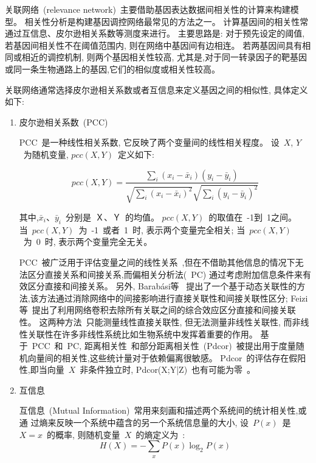 关联网络~(relevance network)~主要借助基因表达数据间相关性的计算来构建模型。
相关性分析是构建基因调控网络最常见的方法之一。
计算基因间的相关性常通过互信息、皮尔逊相关系数等测度来进行。
主要思路是: 对于预先设定的阈值, 若基因间相关性不在阈值范围内, 则在网络中基因间有边相连。
若两基因间具有相同或相近的调控机制, 则两个基因相关性较高,
尤其是,对于同一转录因子的靶基因或同一条生物通路上的基因,它们的相似度或相关性较高。

关联网络通常选择皮尔逊相关系数或者互信息来定义基因之间的相似性, 具体定义如下:
\begin{enumerate}
\item 
皮尔逊相关系数~(PCC)

PCC~是一种线性相关系数, 它反映了两个变量间的线性相关程度。
设~$X$, $Y$~为随机变量, $pcc(X,Y)$~定义如下:

\begin{equation}
pcc(X,Y) = \frac{{\sum\limits_i {(x_i -\bar x_i )(y_i -\bar y_i )} }}{{\sqrt {\sum\limits_i {(x_i  - \bar x_i )^2 } } \sqrt {\sum\limits_i {(y_i  - \bar y_i )^2 } } }}
\end{equation}

其中,$\bar x_i$、$\bar y_i$~分别是~Ｘ、Ｙ~的均值。
$pcc(X,Y)$~的取值在~-1到~1之间。
当~$pcc(X,Y)$~为~-1~或者~1~时, 表示两个变量完全相关;
当~$pcc(X,Y)$~为~0~时, 表示两个变量完全无关。

PCC~被广泛用于评估变量之间的线性关系~\cite{stuart2003gene},但在不借助其他信息的情况下无法区分直接关系和间接关系,而偏相关分析法(~PC) \cite{baba2004partial}通过考虑附加信息条件来有效区分直接和间接关系。
另外, Barabási等~\cite{barzel2013network} 提出了一个基于动态关联性的方法,该方法通过消除网络中的间接影响进行直接关联性和间接关联性区分; 
Feizi等~\cite{feizi2013network}提出了利用网络卷积去除所有关联之间的综合效应区分直接和间接关联性。
这两种方法~\cite{barzel2013network,feizi2013network}只能测量线性直接关联性,
但无法测量非线性关联性, 而非线性关联性在许多非线性系统比如生物系统中发挥着重要的作用。
基于~PCC~和~PC, 距离相关性~\cite{szekely2007measuring,kosorok2009brownian}和部分距离相关性~(Pdcor)~\cite{szekely2014partial}被提出用于度量随机向量间的相关性,这些统计量对于依赖偏离很敏感。
Pdcor~的评估存在假阳性,即当向量~$X$~非条件独立时, Pdcor(X;Y|Z)~也有可能为零~\cite{szekely2014partial}。

\item 
互信息

互信息~(Mutual Information)~常用来刻画和描述两个系统间的统计相关性,或通
过熵来反映一个系统中蕴含的另一个系统信息量的大小, 设~$P(x)$~是~$X=x$~的概率,
则随机变量~$X$~的熵定义为~\cite{cover2012elements}:
\begin{equation}
H(X) = - \sum\limits_x {P(x)\log _2 P(x)} 
\end{equation}


\end{enumerate}
